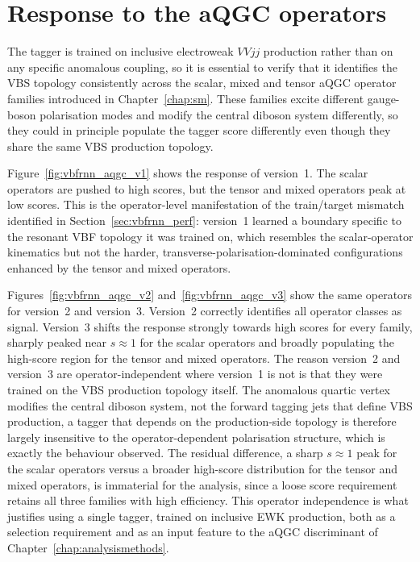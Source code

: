 \section{Response to the aQGC operators}
\label{sec:vbfrnn_aqgc}

The tagger is trained on inclusive electroweak $VVjj$ production rather than on any specific anomalous coupling, so it is essential to verify that it identifies the VBS topology consistently across the scalar, mixed and tensor aQGC operator families introduced in Chapter~\ref{chap:sm}. These families excite different gauge-boson polarisation modes and modify the central diboson system differently, so they could in principle populate the tagger score differently even though they share the same VBS production topology.

Figure~\ref{fig:vbfrnn_aqgc_v1} shows the response of version~1. The scalar operators are pushed to high scores, but the tensor and mixed operators peak at low scores. This is the operator-level manifestation of the train/target mismatch identified in Section~\ref{sec:vbfrnn_perf}: version~1 learned a boundary specific to the resonant VBF topology it was trained on, which resembles the scalar-operator kinematics but not the harder, transverse-polarisation-dominated configurations enhanced by the tensor and mixed operators.

Figures~\ref{fig:vbfrnn_aqgc_v2} and~\ref{fig:vbfrnn_aqgc_v3} show the same operators for version~2 and version~3. Version~2 correctly identifies all operator classes as signal. Version~3 shifts the response strongly towards high scores for every family, sharply peaked near $s\approx1$ for the scalar operators and broadly populating the high-score region for the tensor and mixed operators. The reason version~2 and version~3 are operator-independent where version~1 is not is that they were trained on the VBS production topology itself. The anomalous quartic vertex modifies the central diboson system, not the forward tagging jets that define VBS production, a tagger that depends on the production-side topology is therefore largely insensitive to the operator-dependent polarisation structure, which is exactly the behaviour observed. The residual difference, a sharp $s\approx1$ peak for the scalar operators versus a broader high-score distribution for the tensor and mixed operators, is immaterial for the analysis, since a loose score requirement retains all three families with high efficiency. This operator independence is what justifies using a single tagger, trained on inclusive EWK production, both as a selection requirement and as an input feature to the aQGC discriminant of Chapter~\ref{chap:analysismethods}.

